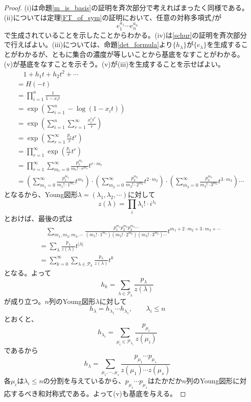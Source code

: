 \documentclass{ltjsreport}
\begin{document}
\begin{proof}
  (i)は命題\ref{m_is_basis}の証明を斉次部分で考えればまったく同様である。(ii)については定理\ref{FT_of_sym}の証明において、任意の対称多項式$f$が
  \[
  e_1^{a_1}\cdots e_n^{a_n}
  \]
  で生成されていることを示したことからわかる。(iv)は\ref{schur}の証明を斉次部分で行えばよい。(iii)については、命題\ref{det_formula}より$\{h_\lambda\}$が$\{e_\lambda\}$を生成することがわかるが、ともに集合の濃度が等しいことから基底をなすことがわかる。(v)が基底をなすことを示そう。(v)が(iii)を生成することを示せばよい。
  \begin{align*}
    &\quad1+h_1t+h_2t^2+\cdots\\
    &=H(-t)\\
    &=\prod_{i=1}^n\frac{1}{1-x_it}\\
    &=\exp \left(\sum_{i=1}^n-\log(1-x_it)\right)\\
    &=\exp \left(\sum_{i=1}^n\sum_{r=1}^\infty\frac{x_i^rt^r}{r}\right)\\
    &=\exp \left(\sum_{r=1}^\infty\frac{p_r}{r}t^r\right)\\
    &=\prod_{r=1}^\infty\exp \left(\frac{p_r}{r}t^r\right)\\
    &=\prod_{r=1}^\infty \sum_{m_r=0}^\infty \frac{p_r^{m_r}}{m_r!\cdot r^{m_r}}t^{r\cdot m_r}\\
    &=
    \left(\sum_{m_1=0}^\infty \frac{p_1^{m_1}}{m_1!\cdot 1^{m_1}}t^{m_1}\right)\cdot
    \left(\sum_{m_2=0}^\infty \frac{p_2^{m_2}}{m_2!\cdot 2^{m_2}}t^{2 \cdot m_2}\right)\cdot
    \left(\sum_{m_3=0}^\infty \frac{p_3^{m_3}}{m_3!\cdot 3^{m_3}}t^{3 \cdot m_3}\right)\cdots
  \end{align*}
  となるから、Young図形$\lambda=(\lambda_1,\lambda_2,\cdots)$に対して
  \[
  z(\lambda)=\prod_{i}\lambda_i!\cdot i^{\lambda_i}  
  \]
  とおけば、最後の式は
  \begin{align*}
    &\quad\sum_{m_1,m_2,m_3,\cdots}\frac{p_1^{m_1}p_2^{m_2}p_3^{m_3}\cdots}{(m_1!\cdot 1^{m_1})(m_2!\cdot 2^{m_2})(m_3!\cdot 3^{m_3})\cdots}t^{m_1+2\cdot m_2+3\cdot m_3+\cdots}\\
    &=\sum_{\lambda}\frac{p_\lambda}{z(\lambda)}t^{|\lambda|}\\
    &=\sum_{k=0}^\infty \sum_{\lambda\in\mathcal{P}_{k}}\frac{p_\lambda}{z(\lambda)}t^k
  \end{align*}
  となる。よって
  \[
  h_k=\sum_{\lambda\in\mathcal{P}_{k}}\frac{p_\lambda}{z(\lambda)}
  \]
  が成り立つ。$n$列のYoung図形$\lambda$に対して
  \[
  h_\lambda=h_{\lambda_1}\cdots h_{\lambda_s},\qquad \lambda_i\leq n 
  \]
  とおくと、
  \[
  h_{\lambda_i}=\sum_{\mu_i\in\mathcal{P}_{\lambda_i}}\frac{p_{\mu_i}}{z(\mu_i)}  
  \]
  であるから
  \[
  h_\lambda=\sum_{\mu_1,\cdots,\mu_s}\frac{p_{\mu_1}\cdots p_{\mu_s}}{z(\mu_1)\cdots z(\mu_s)}  
  \]
  各$\mu_i$は$\lambda_i\leq n$の分割を与えているから、$p_{\mu_1}\cdots p_{\mu_s}$はたかだか$n$列のYoung図形に対応するべき和対称式である。よって(v)も基底を与える。
\end{proof}
\end{document}
